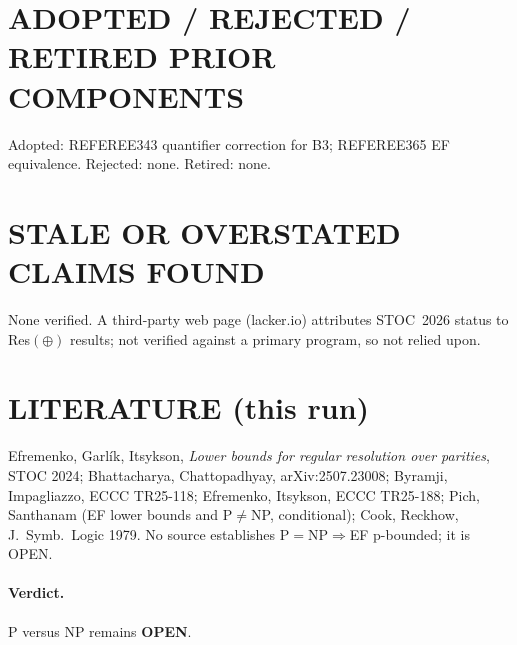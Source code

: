 \documentclass[11pt]{article}
\begin{document}
\section*{ADOPTED / REJECTED / RETIRED PRIOR COMPONENTS}
Adopted: REFEREE343 quantifier correction for B3; REFEREE365 EF equivalence.
Rejected: none. Retired: none.

\section*{STALE OR OVERSTATED CLAIMS FOUND}
None verified. A third-party web page (lacker.io) attributes STOC~2026 status to
Res$(\oplus)$ results; not verified against a primary program, so not relied upon.

\section*{LITERATURE (this run)}
Efremenko, Garl\'ik, Itsykson, \emph{Lower bounds for regular resolution over parities}, STOC 2024;
Bhattacharya, Chattopadhyay, arXiv:2507.23008;
Byramji, Impagliazzo, ECCC TR25-118;
Efremenko, Itsykson, ECCC TR25-188;
Pich, Santhanam (EF lower bounds and P$\ne$NP, conditional);
Cook, Reckhow, J.~Symb.~Logic 1979. No source establishes P$=$NP$\Rightarrow$EF
p-bounded; it is OPEN.

\paragraph{Verdict.} P versus NP remains \textbf{OPEN}.
\end{document}
